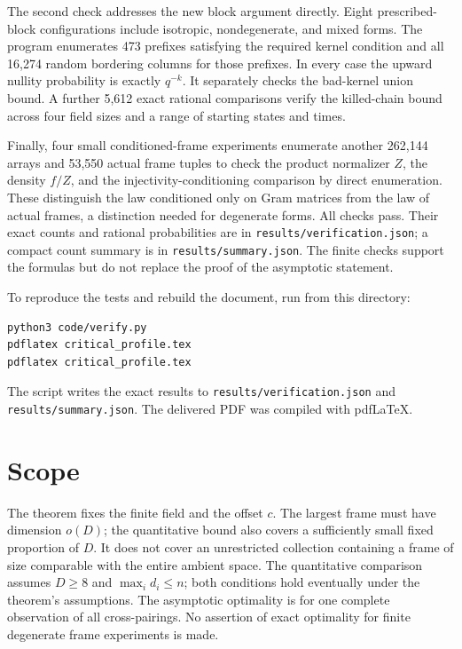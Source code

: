 \documentclass[11pt,letterpaper]{article}
\begin{document}
The second check addresses the new block argument directly. Eight
prescribed-block configurations include isotropic, nondegenerate, and
mixed forms. The program enumerates 473 prefixes satisfying the required
kernel condition and all 16,274 random bordering columns for those
prefixes. In every case the upward nullity probability is exactly
$q^{-k}$. It separately checks the bad-kernel union bound. A further 5,612
exact rational comparisons verify the killed-chain bound across four
field sizes and a range of starting states and times.

Finally, four small conditioned-frame experiments enumerate another
262,144 arrays and 53,550 actual frame tuples to check the product
normalizer $Z$, the density $f/Z$, and the injectivity-conditioning
comparison by direct enumeration. These distinguish the law conditioned
only on Gram matrices from the law of actual frames, a distinction needed
for degenerate forms. All checks pass. Their exact counts and rational
probabilities are in \texttt{results/verification.json}; a compact count
summary is in \texttt{results/summary.json}. The finite checks support the
formulas but do not replace the proof of the asymptotic statement.

To reproduce the tests and rebuild the document, run from this directory:
\begin{verbatim}
python3 code/verify.py
pdflatex critical_profile.tex
pdflatex critical_profile.tex
\end{verbatim}
The script writes the exact results to \texttt{results/verification.json}
and \texttt{results/summary.json}. The delivered PDF was compiled with pdfLaTeX.

\section{Scope}
The theorem fixes the finite field and the offset $c$. The largest frame
must have dimension $o(D)$; the quantitative bound also covers a sufficiently
small fixed proportion of $D$. It does not cover an unrestricted collection
containing a frame of size comparable with the entire ambient space.
The quantitative comparison assumes $D\ge8$ and $\max_i d_i\le n$;
both conditions hold eventually under the theorem's assumptions.
The asymptotic optimality is for one complete observation of all
cross-pairings. No assertion of exact optimality for finite degenerate
frame experiments is made.
\end{document}
